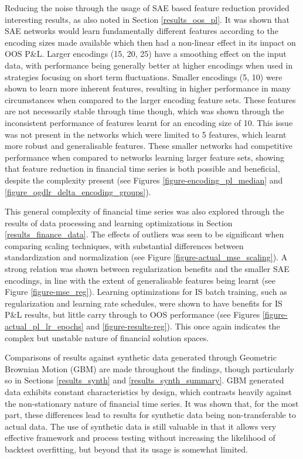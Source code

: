 \documentclass[a4paper,11pt,oneside]{article}
\theoremstyle{plain}
\theoremstyle{definition}
\begin{document}
	Reducing the noise through the usage of SAE based feature reduction provided interesting results, as also noted in Section \ref{results_oos_pl}. It was shown that SAE networks would learn fundamentally different features according to the encoding sizes made available which then had a non-linear effect in its impact on OOS P\&L. Larger encodings (15, 20, 25) have a smoothing effect on the input data, with performance being generally better at higher encodings when used in strategies focusing on short term fluctuations. Smaller encodings (5, 10) were shown to learn more inherent features, resulting in higher performance in many circumstances when compared to the larger encoding feature sets. These features are not necessarily stable through time though, which was shown through the inconsistent performance of features learnt for an encoding size of 10. This issue was not present in the networks which were limited to 5 features, which learnt more robust and generalisable features. These smaller networks had competitive performance when compared to networks learning larger feature sets, showing that feature reduction in financial time series is both possible and beneficial, despite the complexity present (see Figures \ref{figure-encoding_pl_median} and \ref{figure_ogdlr_delta_encoding_groups}). \newline	
	
	This general complexity of financial time series was also explored through the results of data processing and learning optimizations in Section \ref{results_finance_data}. The effects of outliers was seen to be significant when comparing scaling techniques, with substantial differences between standardization and normalization (see Figure \ref{figure-actual_mse_scaling}). A strong relation was shown between regularization benefits and the smaller SAE encodings, in line with the extent of generalisable features being learnt (see Figure \ref{figure-mse_reg}). Learning optimizations for IS batch training, such as regularization and learning rate schedules, were shown to have benefits for IS P\&L results, but little carry through to OOS performance (see Figures \ref{figure-actual_pl_lr_epochs} and \ref{figure-results-reg}). This once again indicates the complex but unstable nature of financial solution spaces.\newline	
	
	Comparisons of results against synthetic data generated through Geometric Brownian Motion (GBM) are made throughout the findings, though particularly so in Sections \ref{results_synth} and \ref{results_synth_summary}. GBM generated data exhibits constant characteristics by design, which contrasts heavily against the non-stationary nature of financial time series. It was shown that, for the most part, these differences lead to results for synthetic data being non-transferable to actual data. The use of synthetic data is still valuable in that it allows very effective framework and process testing without increasing the likelihood of backtest overfitting, but beyond that its usage is somewhat limited. \newline
	
\end{document}
